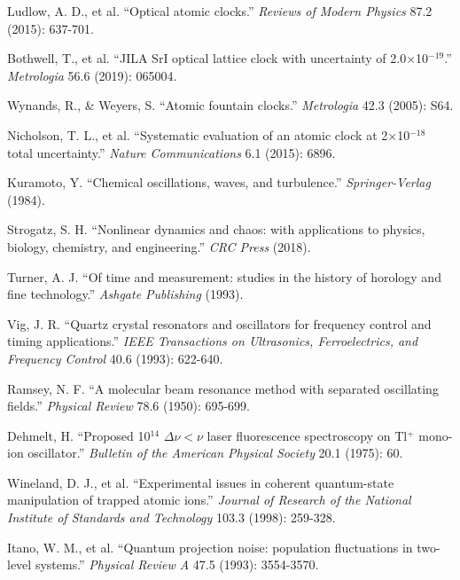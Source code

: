 \documentclass[11pt]{article}
\theoremstyle{remark}
\begin{document}
\begin{thebibliography}{99}

Ludlow, A. D., et al. ``Optical atomic clocks.'' \textit{Reviews of Modern Physics} 87.2 (2015): 637-701.

Bothwell, T., et al. ``JILA SrI optical lattice clock with uncertainty of 2.0×10$^{-19}$.'' \textit{Metrologia} 56.6 (2019): 065004.

Wynands, R., \& Weyers, S. ``Atomic fountain clocks.'' \textit{Metrologia} 42.3 (2005): S64.

Nicholson, T. L., et al. ``Systematic evaluation of an atomic clock at 2×10$^{-18}$ total uncertainty.'' \textit{Nature Communications} 6.1 (2015): 6896.

Kuramoto, Y. ``Chemical oscillations, waves, and turbulence.'' \textit{Springer-Verlag} (1984).

Strogatz, S. H. ``Nonlinear dynamics and chaos: with applications to physics, biology, chemistry, and engineering.'' \textit{CRC Press} (2018).

Turner, A. J. ``Of time and measurement: studies in the history of horology and fine technology.'' \textit{Ashgate Publishing} (1993).

Vig, J. R. ``Quartz crystal resonators and oscillators for frequency control and timing applications.'' \textit{IEEE Transactions on Ultrasonics, Ferroelectrics, and Frequency Control} 40.6 (1993): 622-640.

Ramsey, N. F. ``A molecular beam resonance method with separated oscillating fields.'' \textit{Physical Review} 78.6 (1950): 695-699.

Dehmelt, H. ``Proposed 10$^{14}$ $\Delta\nu < \nu$ laser fluorescence spectroscopy on Tl$^+$ mono-ion oscillator.'' \textit{Bulletin of the American Physical Society} 20.1 (1975): 60.

Wineland, D. J., et al. ``Experimental issues in coherent quantum-state manipulation of trapped atomic ions.'' \textit{Journal of Research of the National Institute of Standards and Technology} 103.3 (1998): 259-328.

Itano, W. M., et al. ``Quantum projection noise: population fluctuations in two-level systems.'' \textit{Physical Review A} 47.5 (1993): 3554-3570.


\end{thebibliography}
\end{document}
